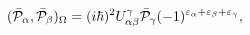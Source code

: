 \begin{equation}
(\bar{{\cal P}}_{\alpha},\bar{{\cal P}}_{\beta})_{\Omega}=(i\hbar
)^{2}U_{\alpha\beta}^{\gamma}\bar{{\cal P}}_{\gamma}(-1)^{\varepsilon
_{\alpha}+\varepsilon_{\beta}+\varepsilon_{\gamma}},\label{2.6}%
\end{equation}

